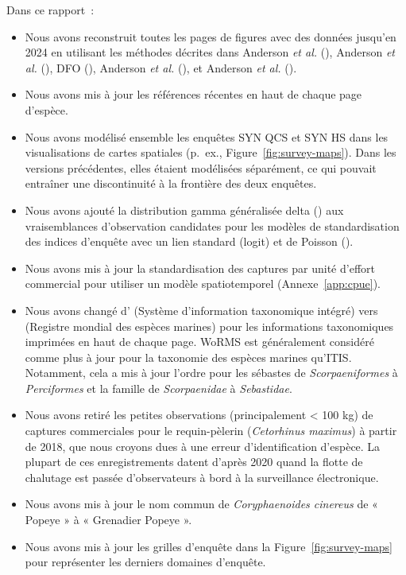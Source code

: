 \documentclass[12pt]{article}\usepackage[]{graphicx}\usepackage[]{color}
\begin{document}
Dans ce rapport~:
\begin{itemize}

\item
  Nous avons reconstruit toutes les pages de figures avec des données jusqu'en 2024 en utilisant les méthodes décrites dans Anderson \emph{et al.} (), Anderson \emph{et al.} (), DFO (), Anderson \emph{et al.} (), et Anderson \emph{et al.} ().
\item
  Nous avons mis à jour les références récentes en haut de chaque page d'espèce.
\item
  Nous avons modélisé ensemble les enquêtes SYN QCS et SYN HS dans les visualisations de cartes spatiales (p.~ex., Figure~\ref{fig:survey-maps}). Dans les versions précédentes, elles étaient modélisées séparément, ce qui pouvait entraîner une discontinuité à la frontière des deux enquêtes.
\item
  Nous avons ajouté la distribution gamma généralisée delta () aux vraisemblances d'observation candidates pour les modèles de standardisation des indices d'enquête avec un lien standard (logit) et de Poisson ().
\item
  Nous avons mis à jour la standardisation des captures par unité d'effort commercial pour utiliser un modèle spatiotemporel (Annexe~\ref{app:cpue}).
\item
  Nous avons changé d' (Système d'information taxonomique intégré) vers  (Registre mondial des espèces marines) pour les informations taxonomiques imprimées en haut de chaque page. WoRMS est généralement considéré comme plus à jour pour la taxonomie des espèces marines qu'ITIS. Notamment, cela a mis à jour l'ordre pour les sébastes de \emph{Scorpaeniformes} à \emph{Perciformes} et la famille de \emph{Scorpaenidae} à \emph{Sebastidae}.
\item
  Nous avons retiré les petites observations (principalement \textless{} 100 kg) de captures commerciales pour le requin-pèlerin (\emph{Cetorhinus maximus}) à partir de 2018, que nous croyons dues à une erreur d'identification d'espèce. La plupart de ces enregistrements datent d'après 2020 quand la flotte de chalutage est passée d'observateurs à bord à la surveillance électronique.
\item
  Nous avons mis à jour le nom commun de \emph{Coryphaenoides cinereus} de « Popeye » à « Grenadier Popeye ».
\item
  Nous avons mis à jour les grilles d'enquête dans la Figure~\ref{fig:survey-maps} pour représenter les derniers domaines d'enquête.
\end{itemize}
\end{document}
